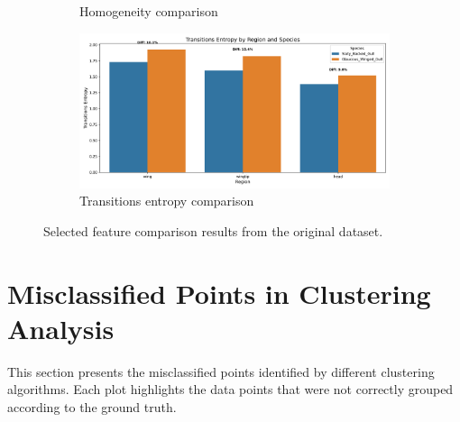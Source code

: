 \documentclass[a4paper,12pt]{report}
\begin{document}
\begin{figure}[htbp]
\begin{subfigure}[b]{0.48\textwidth}
        \caption{Homogeneity comparison}
    \end{subfigure}
    \hfill
    \begin{subfigure}[b]{0.48\textwidth}
        \includegraphics[width=\textwidth]{images/appendix/Original/transitions_entropy_comparison.png}
        \caption{Transitions entropy comparison}
    \end{subfigure}
    \caption{Selected feature comparison results from the original dataset.}
\end{figure}

\section{Misclassified Points in Clustering Analysis}

This section presents the misclassified points identified by different clustering algorithms. Each plot highlights the data points that were not correctly grouped according to the ground truth.
\end{document}
